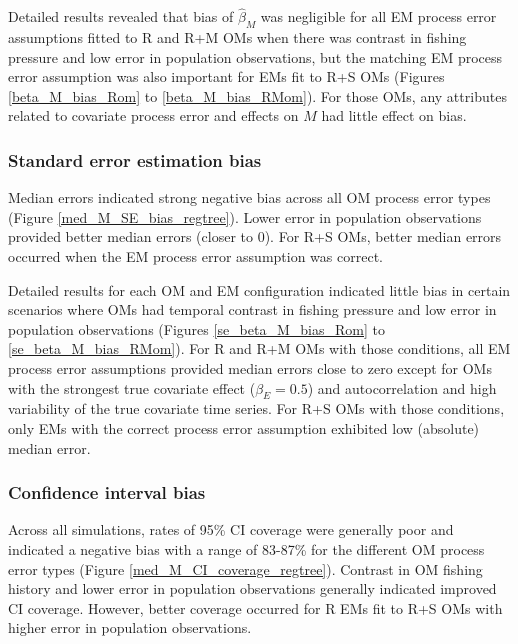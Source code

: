 \documentclass[
  12pt,
]{article}
\begin{document}
Detailed results revealed that bias of \(\widehat \beta_M\) was
negligible for all EM process error assumptions fitted to R and R+M OMs
when there was contrast in fishing pressure and low error in population
observations, but the matching EM process error assumption was also
important for EMs fit to R+S OMs (Figures \ref{beta_M_bias_Rom} to
\ref{beta_M_bias_RMom}). For those OMs, any attributes related to
covariate process error and effects on \(M\) had little effect on bias.

\subsubsection*{Standard error estimation
bias}\label{standard-error-estimation-bias}

Median errors indicated strong negative bias across all OM process error
types (Figure \ref{med_M_SE_bias_regtree}). Lower error in population
observations provided better median errors (closer to 0). For R+S OMs,
better median errors occurred when the EM process error assumption was
correct.

Detailed results for each OM and EM configuration indicated little bias
in certain scenarios where OMs had temporal contrast in fishing pressure
and low error in population observations (Figures
\ref{se_beta_M_bias_Rom} to \ref{se_beta_M_bias_RMom}). For R and R+M
OMs with those conditions, all EM process error assumptions provided
median errors close to zero except for OMs with the strongest true
covariate effect (\(\beta_E = 0.5\)) and autocorrelation and high
variability of the true covariate time series. For R+S OMs with those
conditions, only EMs with the correct process error assumption exhibited
low (absolute) median error.

\subsubsection*{Confidence interval
bias}\label{confidence-interval-bias}

Across all simulations, rates of 95\% CI coverage were generally poor
and indicated a negative bias with a range of 83-87\% for the different
OM process error types (Figure \ref{med_M_CI_coverage_regtree}).
Contrast in OM fishing history and lower error in population
observations generally indicated improved CI coverage. However, better
coverage occurred for R EMs fit to R+S OMs with higher error in
population observations.
\end{document}
